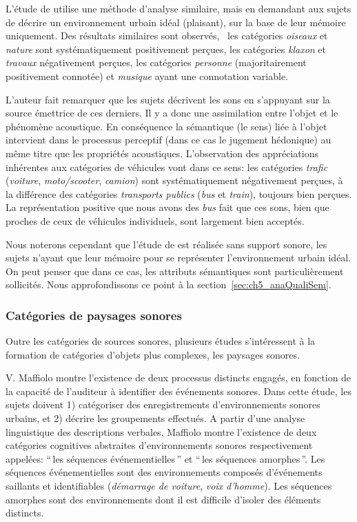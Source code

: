 L'étude de \citep{guastavino2006ideal} utilise une méthode d'analyse similaire, mais en demandant aux sujets de décrire un environnement urbain idéal (plaisant), sur la base de leur mémoire uniquement. Des résultats similaires sont observés, \ie~les catégories \emph{oiseaux} et \emph{nature} sont systématiquement positivement perçues, les catégories \emph{klaxon} et \emph{travaux} négativement perçues, les catégories \emph{personne} (majoritairement positivement connotée) et \emph{musique} ayant une connotation variable.

L'auteur fait remarquer que les sujets décrivent les sons en s'appuyant sur la source émettrice de ces derniers. Il y a donc une assimilation entre l'objet et le phénomène acoustique. En conséquence la sémantique (le sens) liée à l'objet intervient dans le processus perceptif (dans ce cas le jugement hédonique) au même titre que les propriétés acoustiques. L'observation des appréciations inhérentes aux catégories de véhicules vont dans ce sens: les catégories \emph{trafic} (\emph{voiture}, \emph{moto/scooter}, \emph{camion}) sont systématiquement négativement perçues, à la différence des catégories \emph{transports publics} (\emph{bus} et \emph{train}), toujours bien perçues. La représentation positive que nous avons des \emph{bus} fait que ces sons, bien que proches de ceux de véhicules individuels, sont largement bien acceptés.  

Nous noterons cependant que l'étude de \citep{guastavino2006ideal} est réalisée sans support sonore, les sujets n'ayant que leur mémoire pour se représenter l'environnement urbain idéal. On peut penser que dans ce cas, les attributs sémantiques sont particulièrement sollicités. Nous approfondissons ce point à la section~\ref{sec:ch5_anaQualiSem}.  

\subsubsection{Catégories de paysages sonores}
\label{sec:ch3_catsoundscape}

Outre les catégories de sources sonores, plusieurs études s’intéressent à la formation de catégories d'objets plus complexes, les paysages sonores.

V. Maffiolo \citep{maffiolo_caracterisation_1999} montre l'existence de deux processus distincts engagés, en fonction de la capacité de l'auditeur à identifier des événements sonores. Dans cette étude, les sujets doivent 1) catégoriser des enregistrements d'environnements sonores urbains, et 2) décrire les groupements effectués. A partir d'une analyse linguistique des descriptions verbales, Maffiolo montre l'existence de deux catégories cognitives abstraites d'environnements sonores respectivement appelées: ``\,les séquences événementielles\,'' et ``\,les séquences amorphes\,''. Les séquences événementielles sont des environnements composés d'événements saillants et identifiables (\emph{démarrage de voiture}, \emph{voix d'homme}). Les séquences amorphes sont des environnements dont il est difficile d'isoler des éléments distincts.

